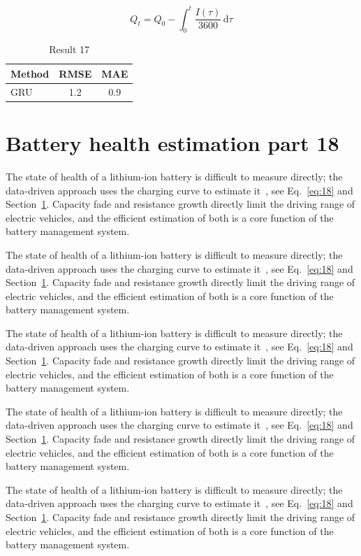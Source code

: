 \documentclass[11pt]{article}
\begin{document}
\begin{equation}\label{eq:17}
  Q_t = Q_0 - \int_0^t \frac{I(\tau)}{3600}\,\mathrm{d}\tau
\end{equation}
\begin{table}[h]\centering\begin{tabular}{lcc}\toprule Method & RMSE & MAE\\\midrule GRU & 1.2 & 0.9\\\bottomrule\end{tabular}\caption{Result 17}\end{table}

\section{Battery health estimation part 18}\label{sec:18}
The state of health of a lithium-ion battery is difficult to measure directly; the data-driven approach uses the charging curve to estimate it~\cite{a2020}, see Eq.~\eqref{eq:18} and Section~\ref{sec:18}. Capacity fade and resistance growth directly limit the driving range of electric vehicles, and the efficient estimation of both is a core function of the battery management system.

The state of health of a lithium-ion battery is difficult to measure directly; the data-driven approach uses the charging curve to estimate it~\cite{a2020}, see Eq.~\eqref{eq:18} and Section~\ref{sec:18}. Capacity fade and resistance growth directly limit the driving range of electric vehicles, and the efficient estimation of both is a core function of the battery management system.

The state of health of a lithium-ion battery is difficult to measure directly; the data-driven approach uses the charging curve to estimate it~\cite{a2020}, see Eq.~\eqref{eq:18} and Section~\ref{sec:18}. Capacity fade and resistance growth directly limit the driving range of electric vehicles, and the efficient estimation of both is a core function of the battery management system.

The state of health of a lithium-ion battery is difficult to measure directly; the data-driven approach uses the charging curve to estimate it~\cite{a2020}, see Eq.~\eqref{eq:18} and Section~\ref{sec:18}. Capacity fade and resistance growth directly limit the driving range of electric vehicles, and the efficient estimation of both is a core function of the battery management system.

The state of health of a lithium-ion battery is difficult to measure directly; the data-driven approach uses the charging curve to estimate it~\cite{a2020}, see Eq.~\eqref{eq:18} and Section~\ref{sec:18}. Capacity fade and resistance growth directly limit the driving range of electric vehicles, and the efficient estimation of both is a core function of the battery management system.
\end{document}
